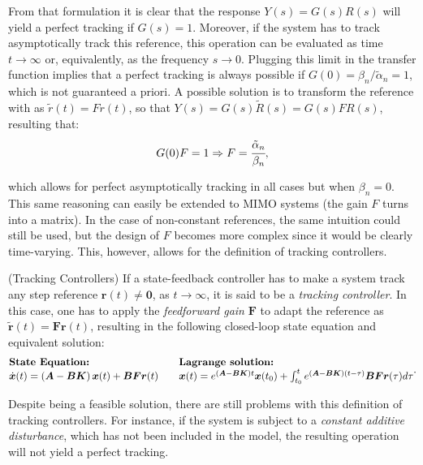 \documentclass[a4paper,11pt]{book}
\numberwithin{figure}{chapter}
\numberwithin{equation}{chapter}
\numberwithin{table}{chapter}
\theoremstyle{definition}
\newtheorem{definition}{Definition}[chapter]
\newcounter{boxed-theorem}
\newcounter{boxed-lemma}
\newcounter{boxed-definition}
\newenvironment{boxed-definition}[1]
{\colorlet{shadecolor}{pastelYellow!15} \begin{shaded} \begin{definition}{#1}}
{\end{definition} \end{shaded}}
\newcounter{boxed-example}
\begin{document}
From that formulation it is clear that the response $Y(s) = G(s)R(s)$ will yield a perfect tracking if $G(s) = 1$. Moreover, if the system has to track asymptotically track this reference, this operation can be evaluated as time $t \to \infty$ or, equivalently, as the frequency $s \to 0$. Plugging this limit in the transfer function implies that a perfect tracking is always possible if $G(0) = \beta_n /  \tilde{\alpha}_n = 1$, which is not guaranteed a priori. A possible solution is to transform the reference with as $\tilde{r}(t) = F r(t)$, so that $Y(s) = G(s)\tilde{R}(s) = G(s) F R(s)$, resulting that:
\begin{equation}
    G(0) F = 1 \Rightarrow F = \cfrac{\tilde{\alpha}_n}{\beta_n}
,\end{equation}

\noindent which allows for perfect asymptotically tracking in all cases but when $\beta_n = 0$. This same reasoning can easily be extended to MIMO systems (the gain $F$ turns into a matrix). In the case of non-constant references, the same intuition could still be used, but the design of $F$ becomes more complex since it would be clearly time-varying. This, however, allows for the definition of tracking controllers.

\begin{boxed-definition}{(Tracking Controllers)} \label{def:tracking}
    If a state-feedback controller has to make a system track any step reference $\bm{r}(t) \neq \bm{0}$, as $t \to \infty$, it is said to be a \textit{tracking controller}. In this case, one has to apply the \textit{feedforward gain} $\bm{F}$ to adapt the reference as $\tilde{\bm{r}}(t) = \bm{F}\bm{r}(t)$, resulting in the following closed-loop state equation and equivalent solution:
    \begin{align}
    \begin{matrix*}[l]
    \textbf{State Equation:} \hfill & & \textbf{Lagrange solution:} \hfill \\
    \dot{\bm{x}}(t) = \left( \bm{A} - \bm{B} \bm{K} \right) \bm{x}(t) + \bm{B} \bm{F} \bm{r}(t)  & &
    \bm{x}(t) = e^{(\bm{A} - \bm{B} \bm{K}) t} \bm{x}(t_0) + \int_{t_0}^{t} e^{(\bm{A} - \bm{B} \bm{K}) (t - \tau)} \bm{B} \bm{F} \bm{r}(\tau) d \tau \hfill
    \end{matrix*}
    .\end{align}
\end{boxed-definition}

Despite being a feasible solution, there are still problems with this definition of tracking controllers. For instance, if the system is subject to a \textit{constant additive disturbance}, which has not been included in the model, the resulting operation will not yield a perfect tracking. 
\end{document}
